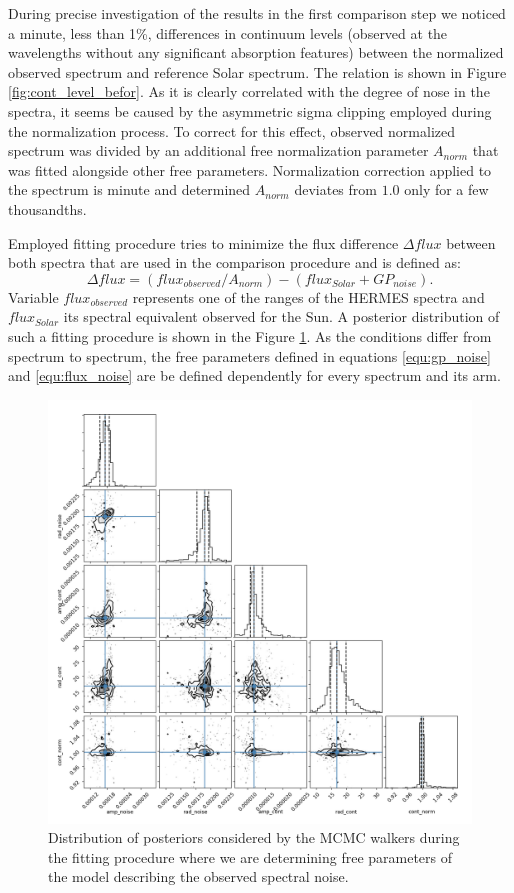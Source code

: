 During precise investigation of the results in the first comparison step we noticed a minute, less than 1\%, differences in continuum levels (observed at the wavelengths without any significant absorption features) between the normalized observed spectrum and reference Solar spectrum. The relation is shown in Figure \ref{fig:cont_level_befor}. As it is clearly correlated with the degree of nose in the spectra, it seems be caused by the asymmetric sigma clipping employed during the normalization process. To correct for this effect, observed normalized spectrum was divided by an additional free normalization parameter $A_{norm}$ that was fitted alongside other free parameters. Normalization correction applied to the spectrum is minute and determined $A_{norm}$ deviates from $1.0$ only for a few thousandths. 

Employed fitting procedure tries to minimize the flux difference $\Delta flux$ between both spectra that are used in the comparison procedure and is defined as:
\begin{equation}
\Delta flux = (flux_{observed}/A_{norm}) - (flux_{Solar} + GP_{noise}).
\label{equ:flux_noise}
\end{equation}
Variable $flux_{observed}$ represents one of the ranges of the HERMES spectra and $flux_{Solar}$ its spectral equivalent observed for the Sun. A posterior distribution of such a fitting procedure is shown in the Figure \ref{fig:gp_corne_plot}. As the conditions differ from spectrum to spectrum, the free parameters defined in equations \ref{equ:gp_noise} and \ref{equ:flux_noise} are be defined dependently for every spectrum and its arm.

\begin{figure}
	\centering
	\includegraphics[width=\columnwidth]{170724005101385_corner_b1.png}
	\caption{Distribution of posteriors considered by the MCMC walkers during the fitting procedure where we are determining free parameters of the model describing the observed spectral noise.}
	\label{fig:gp_corne_plot}
\end{figure}

